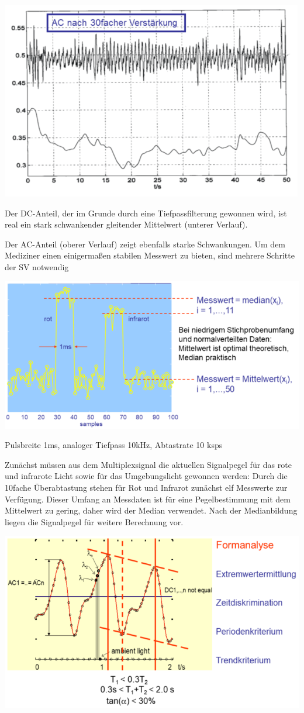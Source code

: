 \documentclass[a4paper]{article}
\begin{document}
\begin{multicols}{3}
  \begin{itemize*}
    \item \includegraphics[width=.5\linewidth]{Assets/Biosignalverarbeitung-pulsoxy-6.png}
    \begin{itemize*}
      \item Der DC-Anteil, der im Grunde durch eine Tiefpassfilterung gewonnen wird, ist real ein stark schwankender gleitender Mittelwert (unterer Verlauf).
      \item Der AC-Anteil (oberer Verlauf) zeigt ebenfalls starke Schwankungen. Um dem Mediziner einen einigermaßen stabilen Messwert zu bieten, sind mehrere Schritte der SV notwendig
    \end{itemize*}
    \item \includegraphics[width=.5\linewidth]{Assets/Biosignalverarbeitung-pulsoxy-7.png}
    \begin{itemize*}
      \item Pulsbreite 1ms, analoger Tiefpass 10kHz, Abtastrate 10 ksps
      \item Zunächst müssen aus dem Multiplexsignal die aktuellen Signalpegel für das rote und infrarote Licht sowie für das Umgebungslicht gewonnen werden: Durch die 10fache Überabtastung stehen für Rot und Infrarot zunächst elf Messwerte zur Verfügung. Dieser Umfang an Messdaten ist für eine Pegelbestimmung mit dem Mittelwert zu gering, daher wird der Median verwendet. Nach der Medianbildung liegen die Signalpegel für weitere Berechnung vor.
    \end{itemize*}
    \item \includegraphics[width=.5\linewidth]{Assets/Biosignalverarbeitung-pulsoxy-8.png}

\end{itemize*}
\end{multicols}
\end{document}
